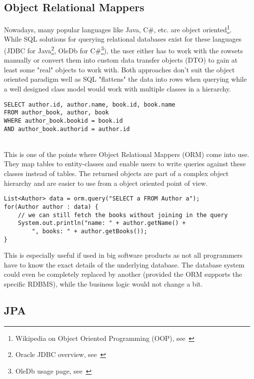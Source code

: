 \subsection{Object Relational Mappers}
Nowadays, many popular languages like Java, C\#, etc. are object oriented\footnote{Wikipedia on Object Oriented Programming (OOP), see~\cite{object_oriented_programming_wiki}}.
While SQL solutions for querying relational databases exist for these languages (JDBC for Java\footnote{Oracle JDBC overview, see~\cite{jdbc_oracle}}, OleDb for C\#\footnote{OleDb usage page, see~\cite{oledb_ms}}), the user either has to work with the rowsets manually or convert them into custom data transfer objects (DTO) to gain at least some "real" objects to work with. Both approaches don't suit the object oriented paradigm well as SQL "flattens" the data into rows when querying while a well designed class model would work with multiple classes in a hierarchy.
\\
\lstset{language=sql}
\begin{lstlisting}[frame=htrbl, caption={SQL "flattening" the author and book table into rows}, label={lst:flattening.sql}]
SELECT author.id, author.name, book.id, book.name 
FROM author_book, author, book
WHERE author_book.bookid = book.id
AND author_book.authorid = author.id
\end{lstlisting}
~\\
This is one of the points where Object Relational Mappers (ORM) come into use. They map tables to entity-classes and
enable users to write queries against these classes instead of tables. The returned objects are part of a complex object hierarchy and are easier to use from a object oriented point of view.
\\
\lstset{language=java}
\begin{lstlisting}[frame=htrbl, caption={ORM query example}, label={lst:flattening.sql}]
List<Author> data = orm.query("SELECT a FROM Author a");
for(Author author : data) {
	// we can still fetch the books without joining in the query
	System.out.println("name: " + author.getName() + 
		", books: " + author.getBooks());
}
\end{lstlisting}
\noindent
This is especially useful if used in big software products as not all programmers have to know the exact details of the underlying database. The database system could even be completely replaced by another (provided the ORM supports the specific RDBMS), while the business logic would not change a bit.

\subsection{JPA}

